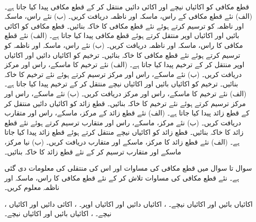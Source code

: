 \\
قطع مکافی  کو  اکائیاں نیچے اور  اکائی دائیں منتقل کر کے قطع مکافی   پیدا کیا جاتا ہے۔ (الف) نئے قطع مکافی کے راس، ماسکہ اور ناظمہ دریافت کریں۔ (ب) نئے راس، ماسکہ اور ناظمہ کو ترسیم کرتے ہوئے نئے قطع مکافی کا خاکہ بنائیں۔
قطع مکافی  کو  اکائی بائیں اور  اکائیاں اوپر منتقل کرتے ہوئے قطع مکافی  پیدا کیا جاتا ہے۔   (الف) نئے قطع مکافی کا راس، ماسکہ اور ناظمہ دریافت کریں۔ (ب) نئے راس، ماسکہ اور ناظمہ کو ترسیم کرتے ہوئے نئے قطع مکافی کا خاکہ بنائیں۔
ترخیم  کو  اکائیاں دائیں اور  اکائیاں اوپر منتقل کر کے ترخیم  پیدا کیا جاتا ہے۔ (الف) نئے ترخیم کا ماسکے، راس اور مرکز دریافت کریں۔ (ب) نئے ماسکے، راس اور مرکز ترسیم کرتے ہوئے نئے ترخیم کا خاکہ بنائیں۔
ترخیم  کو  اکائیاں بائیں اور  اکائیاں نیچے منتقل کر کے
 ترخیم  پیدا کیا جاتا ہے۔ (الف) نئے ترخیم کا ماسکے، راس اور مرکز دریافت کریں۔ (ب) نئے ماسکے، راس اور مرکز ترسیم کرتے ہوئے نئے ترخیم کا خاکہ بنائیں۔
قطع زائد  کو  اکائیاں دائیں منتقل کر کے قطع زائد
  پیدا کیا جاتا ہے۔ (الف) نئے قطع زائد کے مرکز، ماسکے، راس اور متقارب دریافت کریں۔ (ب) نئے مرکز، ماسکے، راس اور متقارب ترسیم کرتے ہوئے نئے قطع زائد کا خاکہ بنائیں۔
قطع زائد  کو  اکائیاں نیچے منتقل کرتے ہوئے قطع زائد  پیدا کیا جاتا ہے۔ (الف) نئے قطع زائد کا مرکز، ماسکے اور متقارب دریافت کریں۔ (ب) نیا مرکز، ماسکے اور متقارب ترسیم کر کے نئے قطع زائد کا خاکہ بنائیں۔

سوال  تا سوال  میں قطع مکافی کی مساوات اور اس کی منتقلی کی معلومات دی گئی ہے۔ نئے قطع مکافی کی مساوات تلاش کر کے نئے قطع مکافی کا راس، ماسکہ اور ناظمہ معلوم کریں۔

، 
\quad
{} اکائیاں بائیں اور  اکائیاں  نیچے۔
، 
\quad
{} اکائیاں دائیں اور  اکائیاں  اوپر۔
، 
\quad
{} اکائی دائیں اور  اکائیاں  نیچے۔
، 
\quad
{} اکائیاں بائیں اور  اکائیاں  نیچے۔

